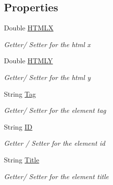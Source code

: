 \subsection*{Properties}
\begin{DoxyCompactItemize}
\item 
Double \hyperlink{class_web_analyzer_1_1_models_1_1_data_model_1_1_d_o_m_element_model_a7aee1f5b1f3f0eafd2cd368a4c7165cf}{H\+T\+M\+L\+X}
\begin{DoxyCompactList}\small\item\em Getter/ Setter for the html x \end{DoxyCompactList}\item 
Double \hyperlink{class_web_analyzer_1_1_models_1_1_data_model_1_1_d_o_m_element_model_a179b7d7715dba28ac6c999208df994d8}{H\+T\+M\+L\+Y}
\begin{DoxyCompactList}\small\item\em Getter/ Setter for the html y \end{DoxyCompactList}\item 
String \hyperlink{class_web_analyzer_1_1_models_1_1_data_model_1_1_d_o_m_element_model_ace6ce5f6a7d2e39c59b256b2b2f5e6eb}{Tag}
\begin{DoxyCompactList}\small\item\em Getter/ Setter for the element tag \end{DoxyCompactList}\item 
String \hyperlink{class_web_analyzer_1_1_models_1_1_data_model_1_1_d_o_m_element_model_a629f3bd5c81651e1ff284f526fabb069}{I\+D}
\begin{DoxyCompactList}\small\item\em Getter / Setter for the element id \end{DoxyCompactList}\item 
String \hyperlink{class_web_analyzer_1_1_models_1_1_data_model_1_1_d_o_m_element_model_a10a1c3ec9fceca5b4745cae7f9647c74}{Title}
\begin{DoxyCompactList}\small\item\em Getter/ Setter for the element title \end{DoxyCompactList}\item 

\end{DoxyCompactItemize}
